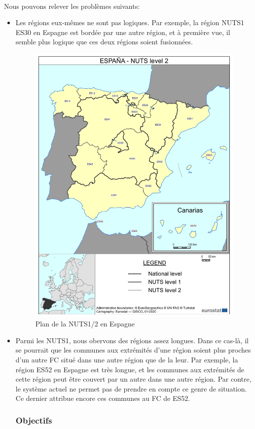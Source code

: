 \begin{itemize}
\paragraph{}
\vspace{-2em}
Nous pouvons relever les problèmes suivants:
\begin{itemize}
    \item Les régions eux-mêmes ne sont pas logiques. Par exemple, la région NUTS1 ES30 en Espagne est bordée par une autre région, et à première vue, il semble plus logique que ces deux régions soient fusionnées.
    \begin{figure}[htbp]
        \centering
        \includegraphics[width=0.6\linewidth]{./Graphismes-UTC/logos/Amazon/NUTS-2-ES.pdf}\hfill
        \caption{Plan de la NUTS1/2 en Espagne}
    \end{figure}
    \item Parmi les NUTS1, nous obervons des régions assez longues. Dans ce cas-là, il se pourrait que les communes aux extrémités d'une région soient plus proches d'un autre FC situé dans une autre région que de la leur. Par exemple, la région ES52 en Espagne est très longue, et les communes aux extrémités de cette région peut être couvert par un autre dans une autre région. Par contre, le système actuel ne permet pas de prendre en compte ce genre de situation. Ce dernier attribue encore ces communes au FC de ES52.
    
\subsubsection{Objectifs}

\end{itemize}
\end{itemize}
